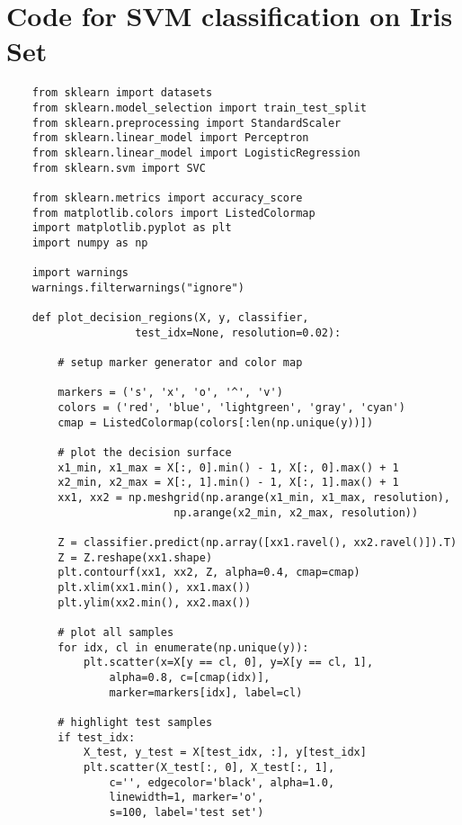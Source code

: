 \documentclass[12pt]{article}
\begin{document}
\section{Code for SVM classification on Iris Set}
\begin{verbatim}
    from sklearn import datasets 
    from sklearn.model_selection import train_test_split
    from sklearn.preprocessing import StandardScaler
    from sklearn.linear_model import Perceptron
    from sklearn.linear_model import LogisticRegression
    from sklearn.svm import SVC
    
    from sklearn.metrics import accuracy_score
    from matplotlib.colors import ListedColormap
    import matplotlib.pyplot as plt
    import numpy as np 
    
    import warnings
    warnings.filterwarnings("ignore")
    
    def plot_decision_regions(X, y, classifier,                     
                    test_idx=None, resolution=0.02):    
        
        # setup marker generator and color map
    
        markers = ('s', 'x', 'o', '^', 'v')    
        colors = ('red', 'blue', 'lightgreen', 'gray', 'cyan')    
        cmap = ListedColormap(colors[:len(np.unique(y))])    
        
        # plot the decision surface    
        x1_min, x1_max = X[:, 0].min() - 1, X[:, 0].max() + 1    
        x2_min, x2_max = X[:, 1].min() - 1, X[:, 1].max() + 1    
        xx1, xx2 = np.meshgrid(np.arange(x1_min, x1_max, resolution),       
                          np.arange(x2_min, x2_max, resolution))    
                          
        Z = classifier.predict(np.array([xx1.ravel(), xx2.ravel()]).T)    
        Z = Z.reshape(xx1.shape)    
        plt.contourf(xx1, xx2, Z, alpha=0.4, cmap=cmap)    
        plt.xlim(xx1.min(), xx1.max())    
        plt.ylim(xx2.min(), xx2.max())    
        
        # plot all samples    
        for idx, cl in enumerate(np.unique(y)):        
            plt.scatter(x=X[y == cl, 0], y=X[y == cl, 1],                    
                alpha=0.8, c=[cmap(idx)],                    
                marker=markers[idx], label=cl)
    
        # highlight test samples    
        if test_idx:        
            X_test, y_test = X[test_idx, :], y[test_idx]           
            plt.scatter(X_test[:, 0], X_test[:, 1], 
                c='', edgecolor='black', alpha=1.0, 
                linewidth=1, marker='o',                 
                s=100, label='test set')
    

\end{verbatim}
\end{document}
